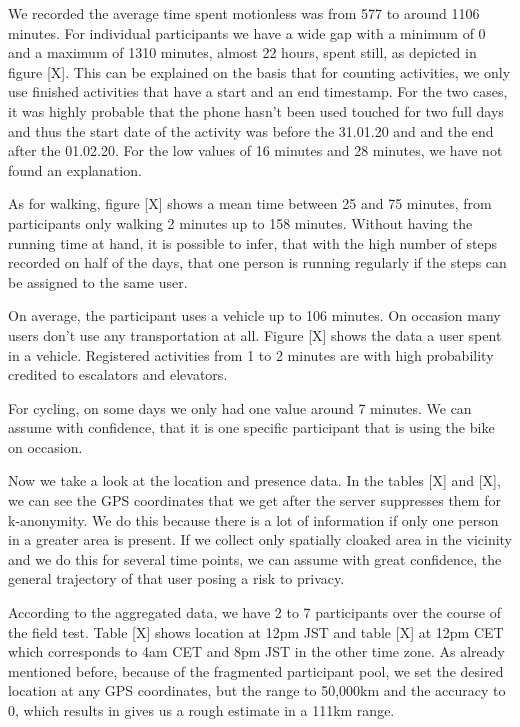 We recorded the average time spent motionless was from 577 to around 1106 minutes. For individual participants we have a wide gap with a minimum of 0 and a maximum of 1310 minutes, almost 22 hours, spent still, as depicted in figure [X]. This can be explained on the basis that for counting activities, we only use finished activities that have a start and an end timestamp. For the two cases, it was highly probable that the phone hasn't been used touched for two full days and thus the start date of the activity was before the 31.01.20 and and the end after the 01.02.20. For the low values of 16 minutes and 28 minutes, we have not found an explanation. 

As for walking, figure [X] shows a mean time between 25 and 75 minutes, from participants only walking 2 minutes up to 158 minutes. Without having the running time at hand, it is possible to infer, that with the high number of steps recorded on half of the days, that one person is running regularly if the steps can be assigned to the same user.

On average, the participant uses a vehicle up to 106 minutes. On occasion many users don't use any transportation at all. Figure [X] shows the data a user spent in a vehicle. Registered activities from 1 to 2 minutes are with high probability credited to escalators and elevators.  

For cycling, on some days we only had one value around 7 minutes. We can assume with confidence, that it is one specific participant that is using the bike on occasion.

Now we take a look at the location and presence data. In the tables [X] and [X], we can see the GPS coordinates that we get after the server suppresses them for k-anonymity. We do this because there is a lot of information if only one person in a greater area is present. If we collect only spatially cloaked area in the vicinity and we do this for several time points, we can assume with great confidence, the general trajectory of that user posing a risk to privacy.

According to the aggregated data, we have 2 to 7 participants over the course of the field test. Table [X] shows location at 12pm JST and table [X] at 12pm CET which corresponds to 4am CET and 8pm JST in the other time zone. As already mentioned before, because of the fragmented participant pool, we set the desired location at any GPS coordinates, but the range to 50,000km and the accuracy to 0, which results in gives us a rough estimate in a 111km range. 

